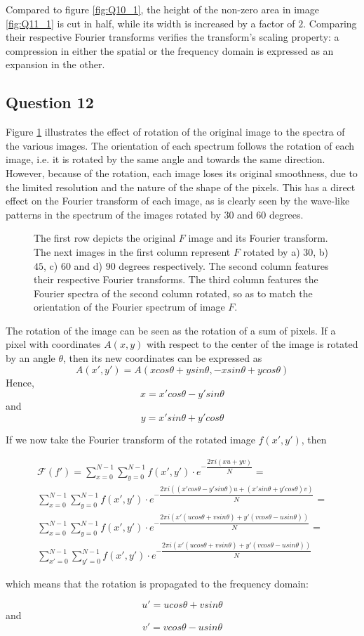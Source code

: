 Compared to figure \ref{fig:Q10_1}, the height of the non-zero area in image \ref{fig:Q11_1} is cut in half, while its width is increased by a factor of $2$.
Comparing their respective Fourier transforms verifies the transform's scaling property: a compression in either the spatial or the frequency domain is expressed
as an expansion in the other.


\subsection{Question 12}

Figure \ref{fig:Q12} illustrates the effect of rotation of the original image to the spectra of the various images. The orientation of each spectrum
follows the rotation of each image, i.e. it is rotated by the same angle and towards the same direction. However, because of the rotation, each
image loses its original smoothness, due to the limited resolution and the nature of the shape of the pixels. This has a direct effect on the Fourier transform
of each image, as is clearly seen by the wave-like patterns in the spectrum of the images rotated by $30$ and $60$ degrees.

\begin{figure}
	\centering
	
	\caption{The first row depicts the original $F$ image and its Fourier transform. The next images in the first column represent $F$ rotated by 
	a) $30$, b) $45$, c) $60$ and d) $90$ degrees respectively. 
	The second column features their respective Fourier transforms. The third column features the Fourier spectra of the second column
	rotated, so as to match the orientation of the Fourier spectrum of image $F$.}
	\label{fig:Q12}
\end{figure}

The rotation of the image can be seen as the rotation of a sum of pixels. If a pixel with coordinates $A(x,y)$ with respect
to the center of the image is rotated by an angle $\theta$, then its new coordinates can be expressed as 
$$A(x',y') = A(x cos\theta + ysin\theta, -x sin\theta + y cos\theta)$$
Hence, $$x = x' cos\theta - y' sin\theta$$ and $$y = x' sin\theta + y' cos\theta$$

If we now take the Fourier transform of the rotated image $f(x',y')$, then

\begin{multline}
\mathcal{F}(f') = \sum_{x=0}^{N-1} \sum_{y=0}^{N-1} f(x',y') \cdot e^{-\dfrac{2 \pi i (xu + yv)}{N}} = \\
\sum_{x=0}^{N-1} \sum_{y=0}^{N-1} f(x',y') \cdot e^{-\dfrac{2 \pi i ((x' cos\theta - y' sin\theta)u + (x' sin\theta + y' cos\theta)v)}{N}} = \\
\sum_{x=0}^{N-1} \sum_{y=0}^{N-1} f(x',y') \cdot e^{-\dfrac{2 \pi i (x' (u cos\theta + v sin\theta) + y' (v cos\theta -u sin\theta))}{N}} = \\
\sum_{x'=0}^{N-1} \sum_{y'=0}^{N-1} f(x',y') \cdot e^{-\dfrac{2 \pi i (x' (u cos\theta + v sin\theta) + y' (v cos\theta -u sin\theta))}{N}}
\end{multline}

which means that the rotation is propagated to the frequency domain:

$$u' = u cos\theta + v sin\theta$$ and $$v' = v cos\theta -u sin\theta$$